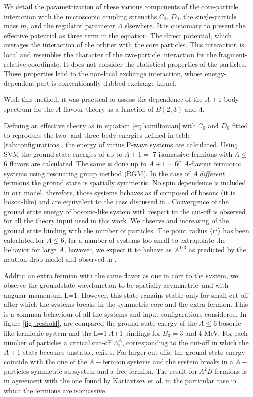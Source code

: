 \documentclass[preprint,12pt]{elsarticle}
\begin{document}
We detail the parametrization of these various components of the core-particle interaction with the
microscopic coupling strengths $C_0$, $D_0$, the single-particle mass $m$, and the regulator parameter $\Lambda$
elsewhere. It is customary to present the effective potential as three term in the equation:
The direct potential, which averages the interaction of the orbiter with the core particles. This interaction is
local and resembles the character of the two-particle interaction for the fragment-relative coordinate. It does not
consider the statistical properties of the particles.
These properties lead to the non-local exchange interaction, whose energy-dependent part is conventionally dubbed
exchange kernel.

With this method, it was practical to assess the dependence of the $A+1$-body spectrum for the $A$-flavour theory
as a function of $B(2,3)$ and $\Lambda$.



Defining an effective theory as in equation \ref{eq:hamiltonian} with $C_0$ and $D_0$ fitted to reproduce the two- and 
three-body energies defined in table \ref{tab:configurations}, the energy of varius P-wave systems are calculated.
Using SVM the ground state energies of up to $A+1=$ 7 isomassive fermions with $A \le $6 flavors are calculated.
The same is done up to $A+1\sim$60 $A$-flavour fermionic systems using resonating group method (RGM).
In the case of $A$ \textit{different} fermions the ground state is spatially symmetric.
No spin dependence is included in our model, therefore, those systems behaves as if composed of bosons (it is boson-like) 
and are equivalent to the case discussed in \cite{manybosons}.
Convergence of the ground state energy of bosonic-like system with respect to the cut-off is observed for all the theory 
input used in this work.
We observe and increasing of the ground state binding with the number of particles. 
The point radius $\langle r^2 \rangle$ has been calculated for $A\le6$, for a number of systems too small to extrapolate the 
behavior for large $A$, however, we expect it to behave as $A^{1/3}$ as predicted by the neutron drop model and observed in  
\cite{manybosons}.

Adding an extra fermion with the same flavor as one in core to the system, we observe the groundstate wavefunction to be 
spatially asymmetric, and with angular momentum L=1.
However, this state remains stable only for small cut-off after which the systems breaks in the symmetric core and the extra 
fermion.
This is a common behaviour of all the systems and input configurations considered.
In figure \ref{fig:treshold}, are compared the ground-state energy of the $A\le 6$  bosonic-like fermionic system and the 
L=1 $A$+1 bindings for $B_3=3$ and $4$ MeV.
For each number of particles a critical cut-off $\Lambda_c^A$, corresponding to the cut-off in which the $A+1$ state becomes 
unstable, exists.
For larger cut-offs, the ground-state energy coincide with the one of the $A-$fermion systems and the system breaks in a $A-$
particles symmetric subsystem and a free fermion.
The result for $A^2B$ fermions is in agreement with the one found by Kartavtsev et al. \cite{Kartavtsev_2007} in the 
particular case in which the fermions are isomassive.
\end{document}
